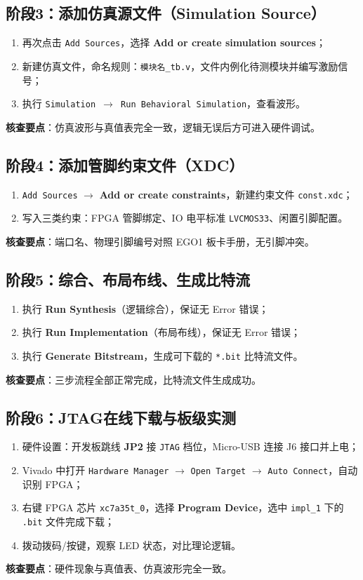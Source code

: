 \documentclass[11pt,a4paper]{article}
\begin{document}
\subsection{阶段3：添加仿真源文件（Simulation Source）}
\begin{enumerate}
    \item 再次点击 \texttt{Add Sources}，选择 \textbf{Add or create simulation sources}；
    \item 新建仿真文件，命名规则：\texttt{模块名\_tb.v}，文件内例化待测模块并编写激励信号；
    \item 执行 \texttt{Simulation $\rightarrow$ Run Behavioral Simulation}，查看波形。
\end{enumerate}
\textbf{核查要点}：仿真波形与真值表完全一致，逻辑无误后方可进入硬件调试。

\subsection{阶段4：添加管脚约束文件（XDC）}
\begin{enumerate}
    \item \texttt{Add Sources} $\rightarrow$ \textbf{Add or create constraints}，新建约束文件 \texttt{const.xdc}；
    \item 写入三类约束：FPGA 管脚绑定、IO 电平标准 \texttt{LVCMOS33}、闲置引脚配置。
\end{enumerate}
\textbf{核查要点}：端口名、物理引脚编号对照 EGO1 板卡手册，无引脚冲突。

\subsection{阶段5：综合、布局布线、生成比特流}
\begin{enumerate}
    \item 执行 \textbf{Run Synthesis}（逻辑综合），保证无 Error 错误；
    \item 执行 \textbf{Run Implementation}（布局布线），保证无 Error 错误；
    \item 执行 \textbf{Generate Bitstream}，生成可下载的 \texttt{*.bit} 比特流文件。
\end{enumerate}
\textbf{核查要点}：三步流程全部正常完成，比特流文件生成成功。

\subsection{阶段6：JTAG在线下载与板级实测}
\begin{enumerate}
    \item 硬件设置：开发板跳线 \textbf{JP2} 接 \texttt{JTAG} 档位，Micro-USB 连接 J6 接口并上电；
    \item Vivado 中打开 \texttt{Hardware Manager} $\rightarrow$ \texttt{Open Target} $\rightarrow$ \texttt{Auto Connect}，自动识别 FPGA；
    \item 右键 FPGA 芯片 \texttt{xc7a35t\_0}，选择 \textbf{Program Device}，选中 \texttt{impl\_1} 下的 \texttt{.bit} 文件完成下载；
    \item 拨动拨码/按键，观察 LED 状态，对比理论逻辑。
\end{enumerate}
\textbf{核查要点}：硬件现象与真值表、仿真波形完全一致。
\end{document}
